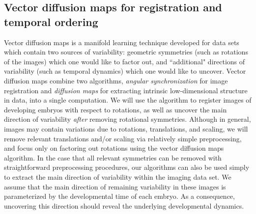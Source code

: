 \documentclass[twocolumn, 10pt]{article}
\begin{document}
\subsection*{Vector diffusion maps for registration and temporal ordering}

Vector diffusion maps \citep{singer2012vector} is a manifold learning
technique developed for data sets which contain two sources of variability:
geometric symmetries (such as rotations of the images) which one would like to factor out,
and ``additional" directions of variability (such as temporal dynamics) which one would like to uncover.
%
Vector diffusion maps combine two algorithms, {\em angular synchronization} \citep{singer2011angular} for image registration and {\em diffusion maps} \citep{coifman2005geometric} for extracting intrinsic low-dimensional structure in data, into a single computation.
%
We will use the algorithm to register images of developing embryos with respect to rotations, as well as uncover the main direction of variability {\it after} removing rotational symmetries.
%
Although in general, images may contain variations due to rotations, translations, and scaling, we will remove relevant translations and/or scaling via relatively simple preprocessing, and focus only on factoring out rotations using the vector diffusion maps algorithm.
%
In the case that all relevant symmetries can be removed with straightforward preprocessing procedures, our algorithms can also be used simply to extract the main direction of variability within the imaging data set. 
%
We assume that the main direction of remaining variability in these images is parameterized by the developmental time of each embryo.
%
As a consequence, uncovering this direction should reveal the underlying developmental dynamics.
\end{document}
